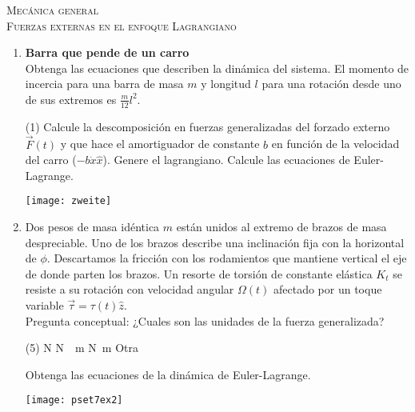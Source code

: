\documentclass[11pt,spanish,a4paper]{article}
\begin{document}
\begin{center}
  \textsc{\large Mecánica general}\\
  \textsc{\large Fuerzas externas en el enfoque Lagrangiano}
\end{center}

\begin{enumerate}

\item 
\begin{minipage}[t][7.5cm]{0.55\textwidth}
\textbf{Barra que pende de un carro}\\

Obtenga las ecuaciones que describen la dinámica del sistema.
El momento de incercia para una barra de masa \(m\) y longitud \(l\) para una rotación desde uno de sus extremos es \(\frac{m}{12} l^2\). 
\begin{tasks}(1)
	\task Calcule la descomposición en fuerzas generalizadas del forzado externo \(\vec{F}(t)\) y que hace el amortiguador de constante \(b\) en función de la velocidad del carro (\(- b \dot{x} \hat{x}\)).
	\task Genere el lagrangiano.
	\task Calcule las ecuaciones de Euler-Lagrange. 
\end{tasks}
\end{minipage}
\begin{minipage}[c][0cm][t]{0.4\textwidth}
	\texttt{[image: zweite]}
\end{minipage}




\item 
\begin{minipage}[t][7.5cm]{0.55\textwidth}
Dos pesos de masa idéntica $m$ están unidos al extremo de brazos de masa despreciable.
Uno de los brazos describe una inclinación fija con la horizontal de $\phi$.
Descartamos la fricción con los rodamientos que mantiene vertical el eje de donde parten los brazos.
Un resorte de torsión de constante elástica $K_t$ se resiste a su rotación con velocidad angular $\Omega(t)$ afectado por un toque variable $\vec{\tau}= \tau (t) \hat{z}$.\\
Pregunta conceptual:
¿Cuales son las unidades de la fuerza generalizada?
\begin{tasks}(5)
	\task \si{\newton}
	\task \si{\newton \over \metre}
	\task \si{\newton \metre}
	\task Otra
\end{tasks}
Obtenga las ecuaciones de la dinámica de Euler-Lagrange. 
\end{minipage}
\begin{minipage}[c][0cm][t]{0.4\textwidth}
	\texttt{[image: pset7ex2]}
\end{minipage}



\end{enumerate}
\end{document}
